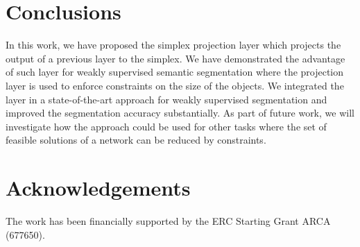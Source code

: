\documentclass{bmvc2k}
\begin{document}
\section{Conclusions}
In this work, we have proposed the simplex projection layer which projects the output of a previous layer to the simplex. We have demonstrated the advantage of such layer for weakly supervised semantic segmentation where the projection layer is used to enforce constraints on the size of the objects. We integrated the layer in a state-of-the-art approach for weakly supervised segmentation and improved the segmentation accuracy substantially. As part of future work, we will investigate how the approach could be used for other tasks where the set of feasible solutions of a network can be reduced by constraints.      

\section*{Acknowledgements}
The work has been financially supported by the ERC Starting Grant ARCA (677650).	
	
	
\end{document}
